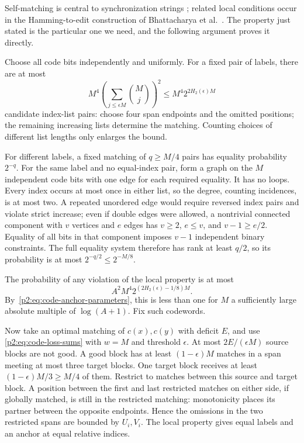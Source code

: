 Self-matching is central to synchronization strings
\cite[Sections~6.1--6.2 of the full version]{HaeuplerShahrasbi2017};
related local conditions occur in the Hamming-to-edit construction of
Bhattacharya et al.\ \cite[Section~2.2]{BhattacharyaEtAl2026}. The property
just stated is the particular one we need, and the following argument
proves it directly.

Choose all code bits independently and uniformly. For a fixed pair of
labels, there are at most
\[
 M^4\left(\sum_{j\leq\epsilon M}\binom Mj\right)^2
 \leq M^4 2^{2H_2(\epsilon)M}
\]
candidate index-list pairs: choose four span endpoints and the omitted
positions; the remaining increasing lists determine the matching. Counting
choices of different list lengths only enlarges the bound.

For different labels, a fixed matching of $q\geq M/4$ pairs has equality
probability $2^{-q}$. For the same label and no equal-index pair, form a
graph on the $M$ independent code bits with one edge for each required
equality. It has no loops. Every index occurs at most once in either list,
so the degree, counting incidences, is at most two. A repeated unordered
edge would require reversed index pairs and violate strict increase; even
if double edges were allowed, a nontrivial connected component with $v$
vertices and $e$ edges has $v\geq2$, $e\leq v$, and $v-1\geq e/2$.
Equality of all bits in that component imposes $v-1$ independent binary
constraints. The full equality system therefore has rank at least $q/2$,
so its probability is at most $2^{-q/2}\leq2^{-M/8}$.

The probability of any violation of the local property is at most
\[
 A^2M^4 2^{(2H_2(\epsilon)-1/8)M}.
\]
By~\eqref{p2:eq:code-anchor-parameters}, this is less than one for $M$ a
sufficiently large absolute multiple of $\log(A+1)$. Fix such codewords.

Now take an optimal matching of $c(x),c(y)$ with deficit $E$, and use
\eqref{p2:eq:code-loss-sums} with $w=M$ and threshold $\epsilon$. At most
$2E/(\epsilon M)$ source blocks are not good. A good block has at least
$(1-\epsilon)M$ matches in a span meeting at most three target blocks.
One target block receives at least $(1-\epsilon)M/3\geq M/4$ of them.
Restrict to matches between this source and target block. A position
between the first and last restricted matches on either side, if globally
matched, is still in the restricted matching: monotonicity places its
partner between the opposite endpoints. Hence the omissions in the two
restricted spans are bounded by $U_i,V_i$. The local property gives equal
labels and an anchor at equal relative indices.

